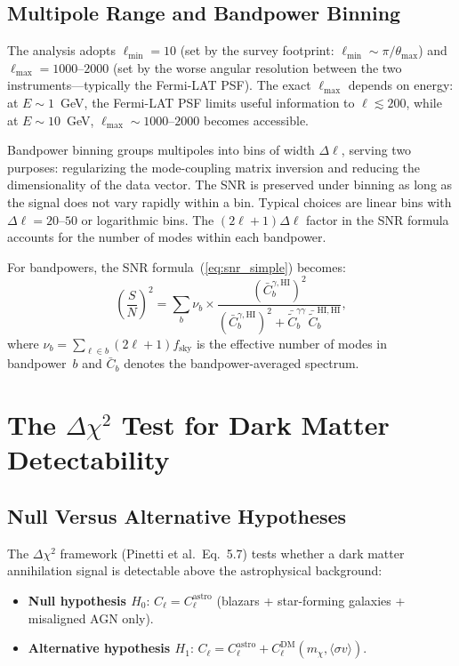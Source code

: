 \documentclass[10pt,a4paper]{article}
\newcommand{\Cl}{C_\ell}
\newcommand{\fsky}{f_{\mathrm{sky}}}
\newcommand{\Dl}{\Delta\ell}
\newcommand{\sigmav}{\langle\sigma v\rangle}
\newcommand{\mchi}{m_\chi}
\begin{document}
\subsection{Multipole Range and Bandpower Binning}

The analysis adopts $\ell_{\min} = 10$ (set by the survey footprint: $\ell_{\min} \sim \pi/\theta_{\max}$) and $\ell_{\max} = 1000$--$2000$ (set by the worse angular resolution between the two instruments---typically the Fermi-LAT PSF). The exact $\ell_{\max}$ depends on energy: at $E \sim 1$~GeV, the Fermi-LAT PSF limits useful information to $\ell \lesssim 200$, while at $E \sim 10$~GeV, $\ell_{\max} \sim 1000$--$2000$ becomes accessible.

Bandpower binning groups multipoles into bins of width $\Dl$, serving two purposes: regularizing the mode-coupling matrix inversion and reducing the dimensionality of the data vector. The SNR is preserved under binning as long as the signal does not vary rapidly within a bin. Typical choices are linear bins with $\Dl = 20$--$50$ or logarithmic bins. The $(2\ell+1)\Dl$ factor in the SNR formula accounts for the number of modes within each bandpower.

For bandpowers, the SNR formula~(\ref{eq:snr_simple}) becomes:
\begin{equation}
\left(\frac{S}{N}\right)^2
= \sum_b \nu_b
\times \frac{(\bar{C}_b^{\gamma,\mathrm{HI}})^2}
{(\bar{C}_b^{\gamma,\mathrm{HI}})^2 + \bar{\tilde{C}}_b^{\gamma\gamma}\, \bar{\tilde{C}}_b^{\mathrm{HI,HI}}},
\label{eq:snr_bandpower}
\end{equation}
where $\nu_b = \sum_{\ell \in b}(2\ell+1)\fsky$ is the effective number of modes in bandpower~$b$ and $\bar{C}_b$ denotes the bandpower-averaged spectrum.


\section{The $\Delta\chi^2$ Test for Dark Matter Detectability}
\label{sec:deltachi2}

\subsection{Null Versus Alternative Hypotheses}

The $\Delta\chi^2$ framework (Pinetti et al.\ Eq.~5.7) tests whether a dark matter annihilation signal is detectable above the astrophysical background:
\begin{itemize}[leftmargin=2em]
\item \textbf{Null hypothesis $H_0$}: $\Cl = \Cl^{\mathrm{astro}}$ (blazars + star-forming galaxies + misaligned AGN only).
\item \textbf{Alternative hypothesis $H_1$}: $\Cl = \Cl^{\mathrm{astro}} + \Cl^{\mathrm{DM}}(\mchi, \sigmav)$.
\end{itemize}
\end{document}
